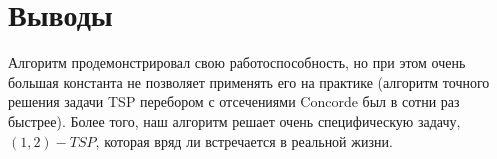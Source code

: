 \section{Выводы}
Алгоритм продемонстрировал свою работоспособность, но при этом очень большая константа не позволяет применять его на практике (алгоритм точного решения задачи TSP перебором с отсечениями Concorde был в сотни раз быстрее). Более того, наш алгоритм решает очень специфическую задачу, $(1, 2)-TSP$, которая вряд ли встречается в реальной жизни.


